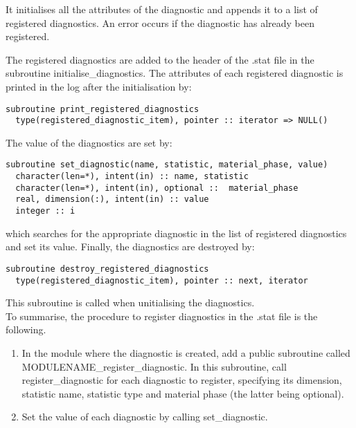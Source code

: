 \documentclass[a4paper, 11pt]{book}
\begin{document}
It initialises all the attributes of the diagnostic and appends it to a list of registered diagnostics. An error occurs if the diagnostic has already been registered. 

The registered diagnostics are added to the header of the .stat file in the subroutine initialise\_diagnostics. The attributes of each registered diagnostic is printed in the log after the initialisation by:

\begin{lstlisting}
subroutine print_registered_diagnostics
  type(registered_diagnostic_item), pointer :: iterator => NULL()
\end{lstlisting}

The value of the diagnostics are set by:

\begin{lstlisting}
subroutine set_diagnostic(name, statistic, material_phase, value)
  character(len=*), intent(in) :: name, statistic 
  character(len=*), intent(in), optional ::  material_phase
  real, dimension(:), intent(in) :: value
  integer :: i
\end{lstlisting}

which searches for the appropriate diagnostic in the list of registered diagnostics and set its value.
Finally, the diagnostics are destroyed by:

\begin{lstlisting}
subroutine destroy_registered_diagnostics
  type(registered_diagnostic_item), pointer :: next, iterator
\end{lstlisting}

This subroutine is called when unitialising the diagnostics.\\

To summarise, the procedure to register diagnostics in the .stat file is the following.

\begin{enumerate}
\item In the module where the diagnostic is created, add a public subroutine called\\ MODULENAME\_register\_diagnostic. In this subroutine, call register\_diagnostic for each diagnostic to register, specifying its dimension, statistic name, statistic type and material phase (the latter being optional).
\item Set the value of each diagnostic by calling set\_diagnostic.
\end{enumerate}
\end{document}
